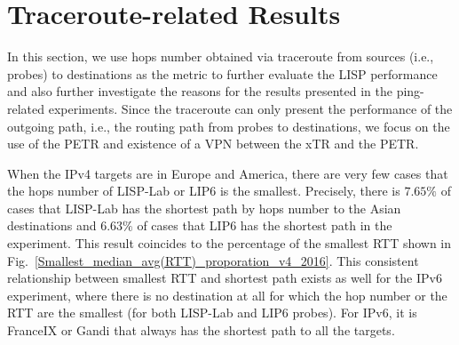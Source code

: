 \section{Traceroute-related Results}
\label{sec:pxtr_traceroute} 
In this section, we use hops number obtained via traceroute from sources (i.e., probes) to destinations as the metric to further evaluate the LISP performance and also further investigate the reasons for the results presented in the ping-related experiments. Since the traceroute can only present the performance of the outgoing path, i.e., the routing path from probes to destinations, we focus on the use of the PETR and existence of a VPN between the xTR and the PETR.

When the IPv4 targets are in Europe and America, there are very few cases that the hops number of LISP-Lab or LIP6 is the smallest. Precisely, there is $7.65\%$ of cases that LISP-Lab has the shortest path by hops number to the Asian destinations and $6.63\%$ of cases that LIP6 has the shortest path in the experiment. This result coincides to the percentage of the smallest RTT shown in Fig.~\ref{Smallest_median_avg(RTT)_proporation_v4_2016}.
This consistent relationship between smallest RTT and shortest path exists as well for the IPv6 experiment, where there is no destination at all for which the hop number or the RTT are the smallest (for both LISP-Lab and LIP6 probes). For IPv6, it is FranceIX or Gandi that always has the shortest path to all the targets.


